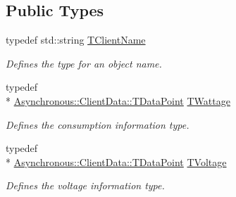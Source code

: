 \subsection*{Public Types}
\begin{DoxyCompactItemize}
\item 
typedef std\-::string \hyperlink{class_matlab_manager_a62cb494115d46fdf4ecc6bd369fe0320}{T\-Client\-Name}
\begin{DoxyCompactList}\small\item\em Defines the type for an object name. \end{DoxyCompactList}\item 
typedef \\*
\hyperlink{class_terra_swarm_1_1_asynchronous_1_1_client_data_ac733720fed15e940f991de44f1bb514e}{Asynchronous\-::\-Client\-Data\-::\-T\-Data\-Point} \hyperlink{class_matlab_manager_a410b78f356aeacba5c43efee93d8c27d}{T\-Wattage}
\begin{DoxyCompactList}\small\item\em Defines the consumption information type. \end{DoxyCompactList}\item 
typedef \\*
\hyperlink{class_terra_swarm_1_1_asynchronous_1_1_client_data_ac733720fed15e940f991de44f1bb514e}{Asynchronous\-::\-Client\-Data\-::\-T\-Data\-Point} \hyperlink{class_matlab_manager_a716643f4f29af3225aedf52d61fd0abe}{T\-Voltage}
\begin{DoxyCompactList}\small\item\em Defines the voltage information type. \end{DoxyCompactList}\end{DoxyCompactItemize}
